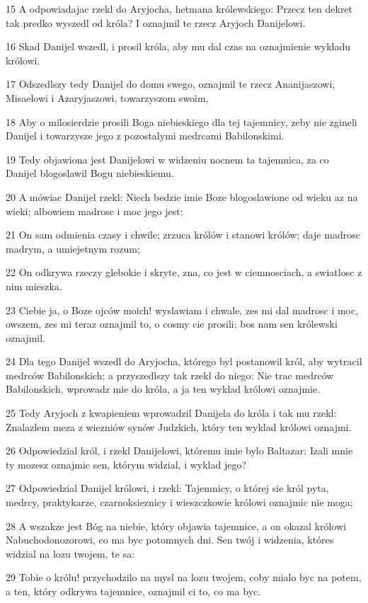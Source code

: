 \par 15 A odpowiadajac rzekl do Aryjocha, hetmana królewskiego: Przecz ten dekret tak predko wyszedl od króla? I oznajmil te rzecz Aryjoch Danijelowi.
\par 16 Skad Danijel wszedl, i prosil króla, aby mu dal czas na oznajmienie wykladu królowi.
\par 17 Odszedlszy tedy Danijel do domu swego, oznajmil te rzecz Ananijaszowi, Misaelowi i Azaryjaszowi, towarzyszom swoim,
\par 18 Aby o milosierdzie prosili Boga niebieskiego dla tej tajemnicy, zeby nie zgineli Danijel i towarzysze jego z pozostalymi medrcami Babilonskimi.
\par 19 Tedy objawiona jest Danijelowi w widzeniu nocnem ta tajemnica, za co Danijel blogoslawil Bogu niebieskiemu.
\par 20 A mówiac Danijel rzekl: Niech bedzie imie Boze blogoslawione od wieku az na wieki; albowiem madrosc i moc jego jest;
\par 21 On sam odmienia czasy i chwile; zrzuca królów i stanowi królów; daje madrosc madrym, a umiejetnym rozum;
\par 22 On odkrywa rzeczy glebokie i skryte, zna, co jest w ciemnosciach, a swiatlosc z nim mieszka.
\par 23 Ciebie ja, o Boze ojców moich! wyslawiam i chwale, zes mi dal madrosc i moc, owszem, zes mi teraz oznajmil to, o cosmy cie prosili; bos nam sen królewski oznajmil.
\par 24 Dla tego Danijel wszedl do Aryjocha, którego byl postanowil król, aby wytracil medrców Babilonskich; a przyszedlszy tak rzekl do niego: Nie trac medrców Babilonskich, wprowadz mie do króla, a ja ten wyklad królowi oznajmie.
\par 25 Tedy Aryjoch z kwapieniem wprowadzil Danijela do króla i tak mu rzekl: Znalazlem meza z wiezniów synów Judzkich, który ten wyklad królowi oznajmi.
\par 26 Odpowiedzial król, i rzekl Danijelowi, któremu imie bylo Baltazar: Izali mnie ty mozesz oznajmic sen, którym widzial, i wyklad jego?
\par 27 Odpowiedzial Danijel królowi, i rzekl: Tajemnicy, o której sie król pyta, medrcy, praktykarze, czarnoksieznicy i wieszczkowie królowi oznajmic nie moga;
\par 28 A wszakze jest Bóg na niebie, który objawia tajemnice, a on okazal królowi Nabuchodonozorowi, co ma byc potomnych dni. Sen twój i widzenia, któres widzial na lozu twojem, te sa:
\par 29 Tobie o królu! przychodzilo na mysl na lozu twojem, coby mialo byc na potem, a ten, który odkrywa tajemnice, oznajmil ci to, co ma byc.
